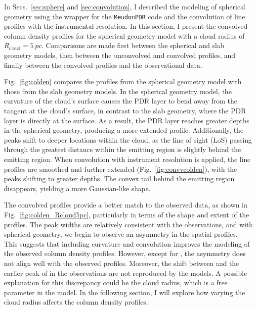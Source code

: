 \documentclass[12pt,a4paper]{article}
\newcommand{\mr}{\mathrm}
\newcommand{\mdpdr}{\texttt{MeudonPDR} code}
\begin{document}
In Secs.~\ref{sec:sphere} and \ref{sec:convolution}, I described the modeling of spherical geometry using the wrapper for the \mdpdr{} and the convolution of line profiles with the instrumental resolution. In this section, I present the convolved column density profiles for the spherical geometry model with a cloud radius of $R_\mr{cloud} = \qty{5}{pc}$. Comparisons are made first between the spherical and slab geometry models, then between the unconvolved and convolved profiles, and finally between the convolved profiles and the observational data.

Fig.~\ref{fig:colden} compares the profiles from the spherical geometry model with those from the slab geometry models. In the spherical geometry model, the curvature of the cloud's surface causes the PDR layer to bend away from the tangent at the cloud's surface, in contrast to the slab geometry, where the PDR layer is directly at the surface. As a result, the PDR layer reaches greater depths in the spherical geometry, producing a more extended profile. Additionally, the peaks shift to deeper locations within the cloud, as the line of sight (LoS) passing through the greatest distance within the emitting region is slightly behind the emitting region. When convolution with instrument resolution is applied, the line profiles are smoothed and further extended (Fig.~\ref{fig:convvcolden}), with the peaks shifting to greater depths. The convex tail behind the emitting region disappears, yielding a more Gaussian-like shape. 

The convolved profiles provide a better match to the observed data, as shown in Fig.~\ref{fig:colden_Rcloud5pc}, particularly in terms of the shape and extent of the profiles. The peak widths are relatively consistent with the observations, and with spherical geometry, we begin to observe an asymmetry in the spatial profiles. This suggests that including curvature and convolution improves the modeling of the observed column density profiles. However, except for , the asymmetry does not align well with the observed profiles. Moreover, the shift between  and the earlier peak of  in the observations are not reproduced by the models. A possible explanation for this discrepancy could be the cloud radius, which is a free parameter in the model. In the following section, I will explore how varying the cloud radius affects the column density profiles.
\end{document}
